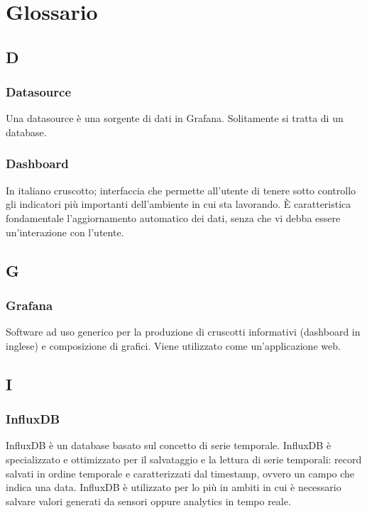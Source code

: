 \section{Glossario}


\subsection*{D}
\subsubsection*{Datasource}
Una datasource è una sorgente di dati in Grafana. Solitamente si tratta di un database.

\subsubsection*{Dashboard}
In italiano cruscotto; interfaccia che permette all'utente di tenere sotto controllo gli indicatori più importanti dell'ambiente in cui sta lavorando. È caratteristica fondamentale l'aggiornamento automatico dei dati, senza che vi debba essere un'interazione con l'utente.

\subsection*{G}
\subsubsection*{Grafana}
Software ad uso generico per la produzione di cruscotti informativi (dashboard in inglese) e composizione di grafici. Viene utilizzato come un'applicazione web.

\subsection*{I}
\subsubsection*{InfluxDB}
InfluxDB è un database basato sul concetto di serie temporale. InfluxDB è specializzato e
ottimizzato per il salvataggio e la lettura di serie temporali: record salvati in ordine temporale
e caratterizzati dal timestamp, ovvero un campo che indica una data. InfluxDB è utilizzato
per lo più in ambiti in cui è necessario salvare valori generati da sensori oppure analytics in
tempo reale.

